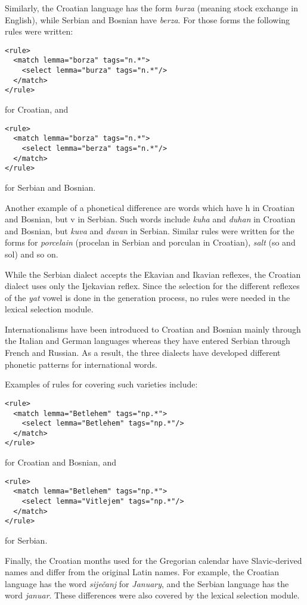 Similarly, the Croatian language has the form \emph{burza} (meaning stock exchange in English), while Serbian and Bosnian have \emph{berza}. 
For those forms the following rules were written:

{\small
\begin{Verbatim}
<rule>
  <match lemma="borza" tags="n.*">
    <select lemma="burza" tags="n.*"/>
  </match>
</rule>
\end{Verbatim}
}
for Croatian, and 
{\small
\begin{Verbatim}
<rule>
  <match lemma="borza" tags="n.*">
    <select lemma="berza" tags="n.*"/>
  </match>
</rule>

\end{Verbatim}
}

for Serbian and Bosnian.

Another example of a phonetical difference are words which have h in Croatian and Bosnian, but v in Serbian.
Such words include \emph{kuha} and \emph{duhan} in Croatian and Bosnian, but \emph{kuva} and \emph{duvan} in Serbian.
Similar rules were written for the forms for \emph{porcelain} (procelan in Serbian and porculan in Croatian), 
\emph{salt} (so and sol) and so on.

While the Serbian dialect accepts the Ekavian and Ikavian reflexes, 
the Croatian dialect uses only the Ijekavian reflex.
Since the selection for the different reflexes of the \emph{yat} vowel is done in the generation process,
no rules were needed in the lexical selection module.

Internationalisms have been introduced to Croatian and Bosnian mainly through the Italian and German languages
whereas they have entered Serbian through French and Russian. 
As a result, the three dialects have developed different phonetic patterns for international words.

Examples of rules for covering such varieties include:
{\small
\begin{Verbatim}
<rule>
  <match lemma="Betlehem" tags="np.*">
    <select lemma="Betlehem" tags="np.*"/>
  </match>
</rule>
\end{Verbatim}
}
for Croatian and Bosnian, and
{\small
\begin{Verbatim}
<rule>
  <match lemma="Betlehem" tags="np.*">
    <select lemma="Vitlejem" tags="np.*"/>
  </match>
</rule>
\end{Verbatim}
}
for Serbian.

Finally, the Croatian months used for the Gregorian calendar have Slavic-derived names and differ from the original Latin names.
For example, the Croatian language has the word \emph{siječanj} for \emph{January}, and 
the Serbian language has the word \emph{januar}.
These differences were also covered by the lexical selection module.

